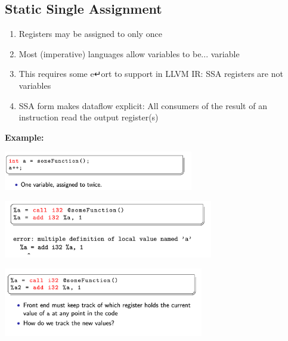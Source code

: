 \documentclass[a4paper]{article}
\theoremstyle{definition}
\begin{document}
\subsection{Static Single Assignment}
\begin{enumerate}
  \item Registers may be assigned to only once
  \item Most (imperative) languages allow variables to be... variable
  \item This requires some e↵ort to support in LLVM IR: SSA registers are not variables
  \item SSA form makes dataflow explicit: All consumers of the result of an instruction read the output register(s)
\end{enumerate}

\textbf{Example:}

\begin{center}
  \includegraphics[height=1.7cm]{img/Snipaste_2021-04-05_17-33-40.png}
  \end{center}
\begin{center}
  \includegraphics[height=2.5cm]{img/Snipaste_2021-04-05_17-34-02.png}
  \end{center}
\begin{center}
  \includegraphics[height=3cm]{img/Snipaste_2021-04-05_17-34-41.png}
  \end{center}
  
\end{document}

